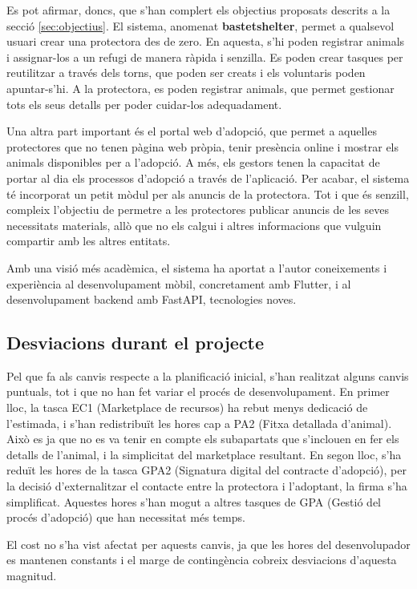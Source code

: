 \documentclass[11pt,a4paper]{report}
\begin{document}
Es pot afirmar, doncs, que s'han complert els objectius proposats descrits a la secció \ref{sec:objectius}. El sistema, anomenat \textbf{bastetshelter}, permet a qualsevol usuari crear una protectora des de zero. En aquesta, s'hi poden registrar animals i assignar-los a un refugi de manera ràpida i senzilla. Es poden crear tasques per reutilitzar a través dels torns, que poden ser creats i els voluntaris poden apuntar-s'hi. A la protectora, es poden registrar animals, que permet gestionar tots els seus detalls per poder cuidar-los adequadament.

Una altra part important és el portal web d'adopció, que permet a aquelles protectores que no tenen pàgina web pròpia, tenir presència online i mostrar els animals disponibles per a l'adopció. A més, els gestors tenen la capacitat de portar al dia els processos d'adopció a través de l'aplicació. Per acabar, el sistema té incorporat un petit mòdul per als anuncis de la protectora. Tot i que és senzill, compleix l'objectiu de permetre a les protectores publicar anuncis de les seves necessitats materials, allò que no els calgui i altres informacions que vulguin compartir amb les altres entitats.

Amb una visió més acadèmica, el sistema ha aportat a l'autor coneixements i experiència al desenvolupament mòbil, concretament amb Flutter, i al desenvolupament backend amb FastAPI, tecnologies noves.
\subsection{Desviacions durant el projecte}
Pel que fa als canvis respecte a la planificació inicial, s'han realitzat alguns canvis puntuals, tot i que no han fet variar el procés de desenvolupament.
En primer lloc, la tasca EC1 (Marketplace de recursos) ha rebut menys dedicació de l'estimada, i s'han redistribuït les hores cap a PA2 (Fitxa detallada d'animal). Això es ja que no es va tenir en compte els subapartats que s'inclouen en fer els detalls de l'animal, i la simplicitat del marketplace resultant.
En segon lloc, s'ha reduït les hores de la tasca GPA2 (Signatura digital del contracte d'adopció), per la decisió d'externalitzar el contacte entre la protectora i l'adoptant, la firma s'ha simplificat. Aquestes hores s'han mogut a altres tasques de GPA (Gestió del procés d'adopció) que han necessitat més temps.

El cost no s'ha vist afectat per aquests canvis, ja que les hores del desenvolupador es mantenen constants i el marge de contingència cobreix desviacions d'aquesta magnitud.
\end{document}
